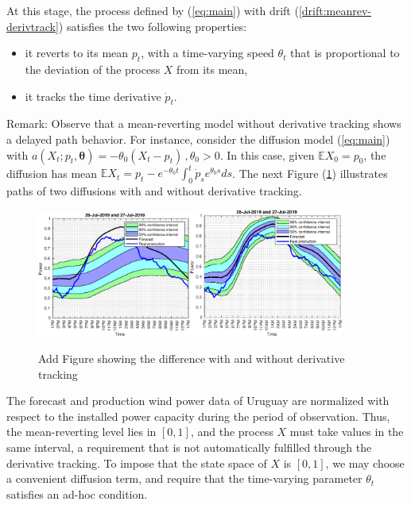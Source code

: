\documentclass[11pt]{article}
\theoremstyle{definition}
\begin{document}
 At this stage, the process defined by (\ref{eq:main}) with drift (\ref{drift:meanrev-derivtrack}) satisfies the two following properties: 
\begin{itemize}
\item it reverts to its mean $p_t$, with a time-varying speed $ \theta_t$ that is proportional to the deviation of the process $X$ from its mean,
\item it tracks the time derivative $\dot{p}_t$.  
\end{itemize} 

Remark: Observe that a mean-reverting model without derivative tracking shows a delayed path behavior. For instance, consider the diffusion model (\ref{eq:main}) with $a(X_t; p_t, \bm{\theta}) = - \theta_0 (X_t - p_t)\,, \theta_0 > 0$. In this case, given  $ \mathbb{E} X_0 = p_0$, the diffusion has mean $\mathbb{E} X_t = p_t - e^{- \theta_0 t } \int_0^t \dot{p}_s  e^{\theta_0 s} ds$. The next Figure (\ref{fig:derivative_tracking}) illustrates paths of two diffusions with and without derivative tracking. 

\begin{figure}[h]
\centering
  \includegraphics[width=0.45\textwidth]{plots/31.eps}\includegraphics[width=0.45\textwidth]{plots/31_2.eps}
  \caption{{\color{red} Add Figure showing the difference with and without derivative tracking}}
  \label{fig:derivative_tracking}
\end{figure}

The forecast and production wind power data of Uruguay are normalized with respect to the installed power capacity during the period of observation. Thus, the mean-reverting level lies in $[0,1]$, and the process $X$  must take values in the same interval, a requirement that is not automatically fulfilled through the derivative tracking. To impose that the state space of $X$ is $[0,1]$, we may choose a convenient diffusion term, and require that the time-varying parameter $ \theta_t$ satisfies an ad-hoc condition.
 
\end{document}
